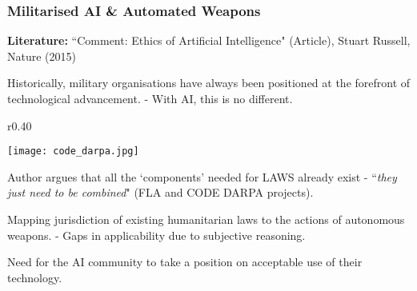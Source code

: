 \documentclass[10pt, compress]{beamer}
\begin{document}
\begin{frame}[fragile]
  \frametitle{Militarised AI \& Automated Weapons}
  
   \small{ 
   
   	\textbf{Literature:} ``Comment: Ethics of Artificial Intelligence" (Article), Stuart Russell, Nature (2015)
   	
   	\vspace{10pt}
   	
   	Historically, military organisations have always been positioned at the forefront of technological advancement. - With AI, this is no different.
   	
   	
   		       \begin{wrapfigure}{r}{0.40\textwidth}
  \begin{center}
  \vspace{-15pt}
    \texttt{[image: code\_darpa.jpg]}
    \vspace{-20pt}
  \end{center}
  \end{wrapfigure}
   	
   	Author argues that all the `components' needed for LAWS already exist - ``\textit{they just need to be combined}" (FLA and CODE DARPA projects).
   	
   Mapping jurisdiction of existing humanitarian laws to the actions of autonomous weapons. - Gaps in applicability due to subjective reasoning.
   
   Need for the AI community to take a position on acceptable use of their technology.
   
     }

\end{frame}
\end{document}
